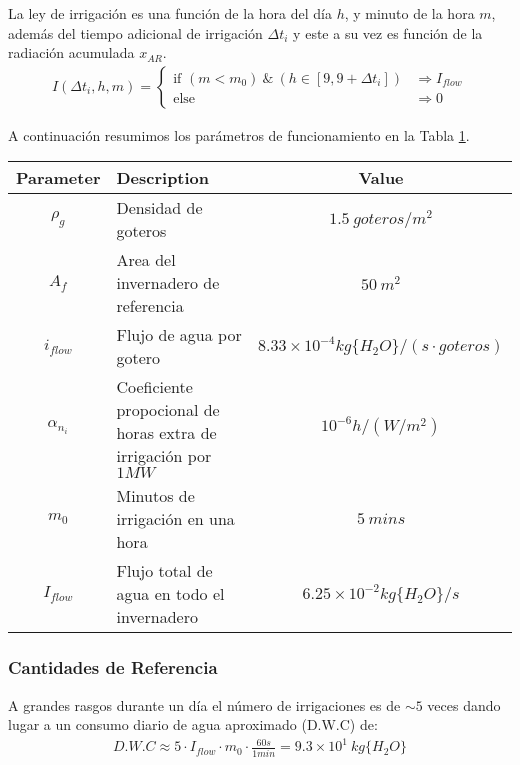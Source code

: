 \documentclass{article}
\begin{document}
La ley de irrigación es una función de la hora del día $h$, y minuto de la hora $m$, además del tiempo adicional de irrigación $\Delta t_i$ y este a su vez  es función de la radiación acumulada $x_{AR}$.
\begin{gather}
    I(\Delta t_i,h,m) = \begin{cases}
            \text{if } (m < m_0) \ \& \ (h \in [9,9+\Delta t_i]) & \Rightarrow I_{flow} \\
            \text{else}  & \Rightarrow 0 
    \end{cases}
\end{gather}

A continuación resumimos los parámetros de funcionamiento en la Tabla \ref{table:irrigation_params}.
\begin{table}[ht!]
    \small
    \centering
    \begin{tabular}{|c|m{5cm}|c|}
        \hline 
        \textbf{Parameter}      & \textbf{Description} & \textbf{Value} \\ \hline \hline
        $\rho_g$       & Densidad de goteros & $1.5 \ goteros/m^2$ \\ \hline
        $A_f$          & Area del invernadero de referencia  & $50 \ m^2$ \\ \hline
        $i_{flow}$     & Flujo de agua por gotero & $8.33 \times 10^{-4}kg\{H_2O\}/(s\cdot goteros)$ \\ \hline 
        $\alpha_{n_i}$ & Coeficiente propocional de horas extra de irrigación por $1MW$& $10^{-6}h/(W/m^2)$   \\ \hline 
        $m_0$          & Minutos de irrigación en una hora & $5 \ mins$ \\ \hline 
        $I_{flow}$     & Flujo total de agua en todo el invernadero & $6.25 \times 10^{-2} kg\{H_2O\}/s$ \\ 
        \hline 
    \end{tabular} 
    \label{table:irrigation_params}
\end{table}

\subsubsection{Cantidades de Referencia}
A grandes rasgos durante un día el número de irrigaciones es de $\sim 5$ veces dando lugar a un consumo diario de agua aproximado (D.W.C) de:
\begin{gather}
    D.W.C \approx 5 \cdot I_{flow}\cdot m_0\cdot\frac{60s}{1min} = 9.3\times 10^{1}  \ kg\{H_2O\}
\end{gather}
 
\end{document}
